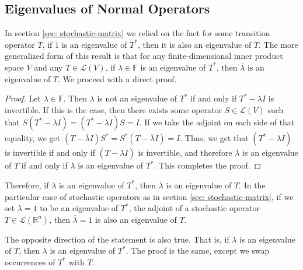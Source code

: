 \documentclass{article}
\renewcommand{\L}{\mathcal{L}}
\newcommand{\F}{\mathbb{F}}
\newcommand{\R}{\mathbb{R}}
\theoremstyle{definition}
\begin{document}
\subsection{Eigenvalues of Normal Operators}
\label{sec: eigenvalues-of-adjoint}

In section \ref{sec: stochastic-matrix} we relied on the fact for some transition operator $T$, if $1$ is an eigenvalue of $T^*$, then it is also an eigenvalue of $T$. The more generalized form of this result is that for any finite-dimensional inner product space $V$ and any $T \in \L(V)$, if $\lambda \in \F$ is an eigenvalue of $T^*$, then $\overline{\lambda}$ is an eigenvalue of $T$. We proceed with a direct proof.

\begin{proof}
    Let $\lambda \in \F$. Then $\lambda$ is not an eigenvalue of $T^*$ if and only if $T^* - \lambda I$ is invertible. If this is the case, then there exists some operator $S \in \L(V)$ such that $S(T^* - \lambda I) = (T^* - \lambda I)S = I$. If we take the adjoint on each side of that equality, we get $(T - \overline{\lambda}I)S^* = S^*(T - \overline{\lambda}I) = I$. Thus, we get that $(T^* - \lambda I)$ is invertible if and only if $(T - \overline{\lambda}I)$ is invertible, and therefore $\overline{\lambda}$ is an eigenvalue of $T$ if and only if $\lambda$ is an eigenvalue of $T^*$. This completes the proof.
\end{proof}
Therefore, if $\lambda$ is an eigenvalue of $T^*$, then $\overline{\lambda}$ is an eigenvalue of $T$. In the particular case of stochastic operators as in section \ref{sec: stochastic-matrix}, if we set $\lambda = 1$ to be an eigenvalue of $T^*$, the adjoint of a stochastic operator $T \in \L(\R^n)$, then $\overline{\lambda} = 1$ is also an eigenvalue of $T$. 

The opposite direction of the statement is also true. That is, if $\lambda$ is an eigenvalue of $T$, then $\overline{\lambda}$ is an eigenvalue of $T^*$. The proof is the same, except we swap occurrences of $T^*$ with $T$.
\end{document}
